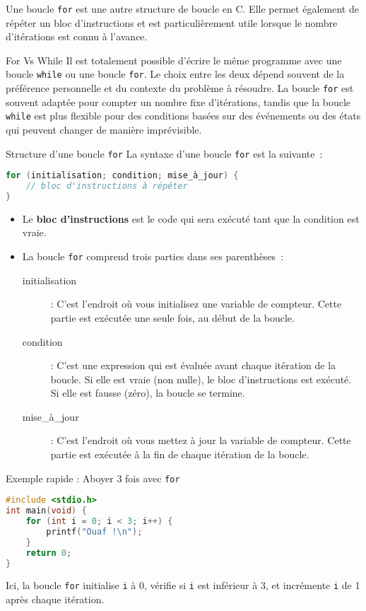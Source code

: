 Une boucle \texttt{for} est une autre structure de boucle en C. Elle permet également de répéter un bloc d'instructions et est particulièrement utile lorsque le nombre d'itérations est connu à l'avance.

\begin{UPSTIinfor}{For Vs While}
	Il est totalement possible d'écrire le même programme avec une boucle \texttt{while} ou une boucle \texttt{for}. Le choix entre les deux dépend souvent de la préférence personnelle et du contexte du problème à résoudre.
	La boucle \texttt{for} est souvent adaptée pour compter un nombre fixe d'itérations, tandis que la boucle \texttt{while} est plus flexible pour des conditions basées sur des événements ou des états qui peuvent changer de manière imprévisible.
\end{UPSTIinfor}

\begin{UPSTIinfor}{Structure d'une boucle \texttt{for}}
La syntaxe d'une boucle \texttt{for} est la suivante :
\begin{lstlisting}[language=c]
for (initialisation; condition; mise_à_jour) {
    // bloc d'instructions à répéter
}
\end{lstlisting}
\begin{itemize}
	\item Le \textbf{bloc d'instructions} est le code qui sera exécuté tant que la condition est vraie.
	\item La boucle \texttt{for} comprend trois parties dans ses parenthèses :
	      \begin{description}
		      \item[initialisation] : C'est l'endroit où vous initialisez une variable de compteur. Cette partie est exécutée une seule fois, au début de la boucle.
		      \item[condition] : C'est une expression qui est évaluée avant chaque itération de la boucle. Si elle est vraie (non nulle), le bloc d'instructions est exécuté. Si elle est fausse (zéro), la boucle se termine.
		      \item[mise\_à\_jour] : C'est l'endroit où vous mettez à jour la variable de compteur. Cette partie est exécutée à la fin de chaque itération de la boucle.
	      \end{description}
\end{itemize}
\end{UPSTIinfor}

\begin{UPSTIinfor}{Exemple rapide : Aboyer 3 fois avec \texttt{for}}
	\begin{lstlisting}[language=c]
#include <stdio.h>
int main(void) {
    for (int i = 0; i < 3; i++) {
        printf("Ouaf !\n");
    }
    return 0;
}
\end{lstlisting}
	Ici, la boucle \texttt{for} initialise \texttt{i} à 0, vérifie si \texttt{i} est inférieur à 3, et incrémente \texttt{i} de 1 après chaque itération.
\end{UPSTIinfor}

